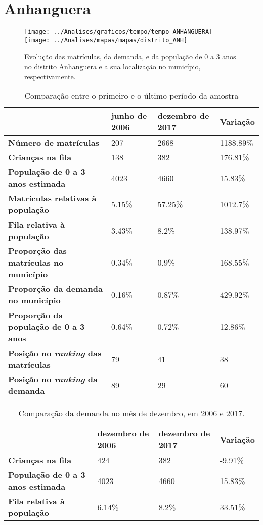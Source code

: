 \section{Anhanguera}
\begin{figure}[H]
\centering
\texttt{[image: ../Analises/graficos/tempo/tempo\_ANHANGUERA]}
\texttt{[image: ../Analises/mapas/mapas/distrito\_ANH]}
\caption{Evolução das matrículas, da demanda, e da população de 0 a 3 anos no distrito Anhanguera e a sua localização no município, respectivamente.}
\end{figure}
\begin{table}[H]
\begin{tabular}{l|l|l|l}
\textbf{}                                      & \textbf{junho de 2006}       & \textbf{dezembro de 2017}    & \textbf{Variação} \\ \hline
\textbf{Número de matrículas}                  & 207 & 2668 & 1188.89\% \\ \hline
\textbf{Crianças na fila}                      & 138 & 382 & 176.81\% \\ \hline
\textbf{População de 0 a 3 anos estimada}      & 4023 & 4660 & 15.83\% \\ \hline
\textbf{Matrículas relativas à população}      & 5.15\% & 57.25\% & 1012.7\% \\ \hline
\textbf{Fila relativa à população}             & 3.43\% & 8.2\% & 138.97\% \\ \hline
\textbf{Proporção das matrículas no município} & 0.34\% & 0.9\% & 168.55\% \\ \hline
\textbf{Proporção da demanda no município}     & 0.16\% & 0.87\% & 429.92\% \\ \hline
\textbf{Proporção da população de 0 a 3 anos}  & 0.64\% & 0.72\% & 12.86\% \\ \hline
\textbf{Posição no \textit{ranking} das matrículas}     & 79 & 41 & 38 \\ \hline
\textbf{Posição no \textit{ranking} da demanda}         & 89 & 29 & 60 \\ 
\end{tabular}
\caption{Comparação entre o primeiro e o último período da amostra}
\end{table}
\begin{table}[H]
\begin{tabular}{l|l|l|l}
\textbf{}                                 & \textbf{dezembro de 2006} & \textbf{dezembro de 2017} & \textbf{Variação} \\ \hline
\textbf{Crianças na fila}                      & 424 & 382 & -9.91\% \\ \hline
\textbf{População de 0 a 3 anos estimada}      & 4023 & 4660 & 15.83\% \\ \hline
\textbf{Fila relativa à população}             & 6.14\% & 8.2\% & 33.51\% \\
\end{tabular}
\caption{Comparação da demanda no mês de dezembro, em 2006 e 2017.}
\end{table}
